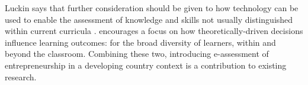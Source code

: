 
    Luckin says that further consideration should be given to how technology can be used to enable the assessment of knowledge and skills not usually distinguished within current curricula \citep{luckin}. \cite{gates} encourages a focus on how theoretically-driven decisions influence learning outcomes: for the broad diversity of learners, within and beyond the classroom. Combining these two, introducing e-assessment of entrepreneurship in a developing country context is a contribution to existing research.
